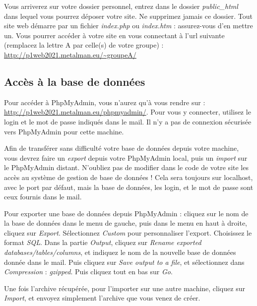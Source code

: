 \bigskip

\noindent Vous arriverez sur votre dossier personnel, entrez dans le dossier \textit{public\_html} dans lequel vous pourrez déposer votre site.
Ne supprimez jamais ce dossier.
Tout site web démarre par un fichier \textit{index.php} ou \textit{index.htm} : assurez-vous d'en mettre un.
Vous pourrer accéder à votre site en vous connectant à l'url suivante (remplacez la lettre A par celle(s) de votre groupe) : \url{http://p1web2021.metalman.eu/~groupeA/}

\bigskip

\subsection{Accès à la base de données}

\noindent Pour accéder à PhpMyAdmin, vous n'aurez qu'à vous rendre sur : \url{http://p1web2021.metalman.eu/phpmyadmin/}.
Pour vous y connecter, utilisez le login et le mot de passe indiqués dans le mail.
Il n'y a pas de connexion sécurisée vers PhpMyAdmin pour cette machine.

\bigskip

\noindent Afin de transférer sans difficulté votre base de données depuis votre machine, vous devrez faire un \textit{export} depuis votre PhpMyAdmin local, puis un \textit{import} sur le PhpMyAdmin distant.
N'oubliez pas de modifier dans le code de votre site les accès au système de gestion de base de données !
Cela sera toujours sur localhost, avec le port par défaut, mais la base de données, les login, et le mot de passe sont ceux fournis dans le mail.

\bigskip

\noindent Pour exporter une base de données depuis PhpMyAdmin : cliquez sur le nom de la base de données dans le menu de gauche, puis dans le menu en haut à droite, cliquez sur \textit{Export}.
Sélectionnez \textit{Custom} pour personnaliser l'export.
Choisissez le format \textit{SQL}.
Dans la partie \textit{Output}, cliquez sur \textit{Rename exported databases/tables/columns}, et indiquez le nom de la nouvelle base de données donnée dans le mail.
Puis cliquez sur \textit{Save output to a file}, et sélectionnez dans \textit{Compression} : \textit{gzipped}.
Puis cliquez tout en bas sur \textit{Go}.

\bigskip

\noindent Une fois l'archive récupérée, pour l'importer sur une autre machine, cliquez sur \textit{Import}, et envoyez simplement l'archive que vous venez de créer.
